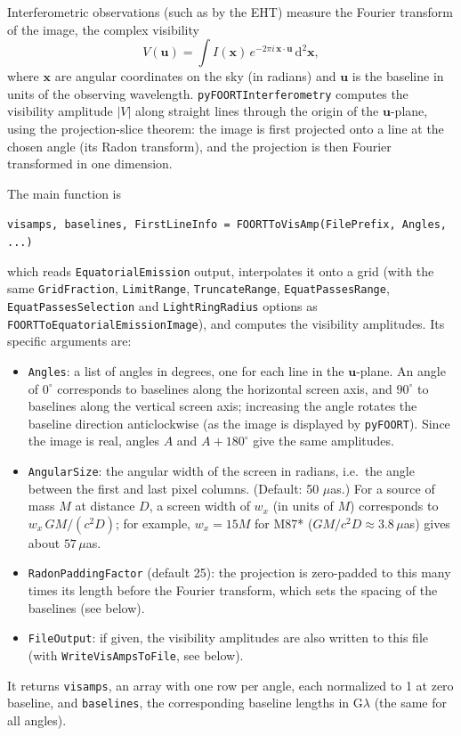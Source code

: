 \documentclass[11pt,a4paper]{article}
\newcommand{\be}{\begin{equation}}
\newcommand{\ee}{\end{equation}}
\newcommand{\code}[1]{{\tt #1}}
\newcommand{\rmd}{\mathrm{d}}
\begin{document}
Interferometric observations (such as by the EHT) measure the Fourier transform of the image, the complex visibility
\be V(\mathbf{u}) = \int I(\mathbf{x})\, e^{-2\pi i\,\mathbf{x}\cdot\mathbf{u}}\, \rmd^2\mathbf{x}, \ee
where $\mathbf{x}$ are angular coordinates on the sky (in radians) and $\mathbf{u}$ is the baseline in units of the observing wavelength. \code{pyFOORTInterferometry} computes the visibility amplitude $|V|$ along straight lines through the origin of the $\mathbf{u}$-plane, using the projection-slice theorem: the image is first projected onto a line at the chosen angle (its Radon transform), and the projection is then Fourier transformed in one dimension.

The main function is
\begin{center}
\code{visamps, baselines, FirstLineInfo = FOORTToVisAmp(FilePrefix, Angles, ...)}
\end{center}
which reads \code{EquatorialEmission} output, interpolates it onto a grid (with the same \code{GridFraction}, \code{LimitRange}, \code{TruncateRange}, \code{EquatPassesRange}, \code{EquatPassesSelection} and \code{LightRingRadius} options as \code{FOORTToEquatorialEmissionImage}), and computes the visibility amplitudes. Its specific arguments are:
\begin{itemize}
 \item \code{Angles}: a list of angles in degrees, one for each line in the $\mathbf{u}$-plane. An angle of $0^\circ$ corresponds to baselines along the horizontal screen axis, and $90^\circ$ to baselines along the vertical screen axis; increasing the angle rotates the baseline direction anticlockwise (as the image is displayed by \code{pyFOORT}). Since the image is real, angles $A$ and $A+180^\circ$ give the same amplitudes.
 \item \code{AngularSize}: the angular width of the screen in radians, i.e.\ the angle between the first and last pixel columns. (Default: 50 $\mu$as.) For a source of mass $M$ at distance $D$, a screen width of $w_x$ (in units of $M$) corresponds to $w_x\, GM/(c^2D)$; for example, $w_x = 15M$ for M87* ($GM/c^2D \approx 3.8\,\mu$as) gives about $57\,\mu$as.
 \item \code{RadonPaddingFactor} (default 25): the projection is zero-padded to this many times its length before the Fourier transform, which sets the spacing of the baselines (see below).
 \item \code{FileOutput}: if given, the visibility amplitudes are also written to this file\\ (with \code{WriteVisAmpsToFile}, see below).
\end{itemize}
It returns \code{visamps}, an array with one row per angle, each normalized to 1 at zero baseline, and \code{baselines}, the corresponding baseline lengths in G$\lambda$ (the same for all angles).
\end{document}
